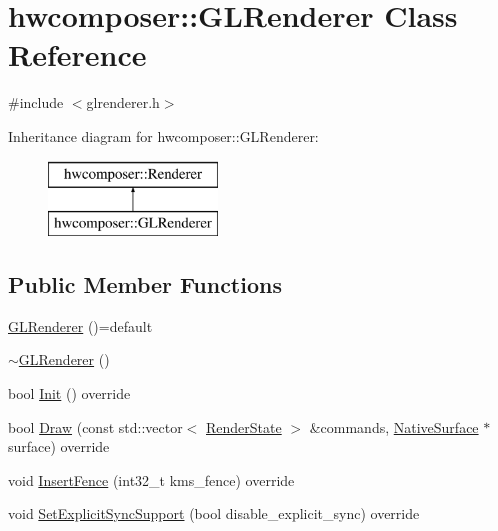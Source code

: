 \hypertarget{classhwcomposer_1_1GLRenderer}{}\section{hwcomposer\+:\+:G\+L\+Renderer Class Reference}
\label{classhwcomposer_1_1GLRenderer}


{\ttfamily \#include $<$glrenderer.\+h$>$}

Inheritance diagram for hwcomposer\+:\+:G\+L\+Renderer\+:\begin{figure}[H]
\begin{center}
\leavevmode
\includegraphics[height=2.000000cm]{classhwcomposer_1_1GLRenderer}
\end{center}
\end{figure}
\subsection*{Public Member Functions}
\begin{DoxyCompactItemize}
\item 
\mbox{\hyperlink{classhwcomposer_1_1GLRenderer_ad7df946c8af9df0bf948c04ecbf043d2}{G\+L\+Renderer}} ()=default
\item 
\mbox{\hyperlink{classhwcomposer_1_1GLRenderer_a8d398306fa084b620d309e9713b197d1}{$\sim$\+G\+L\+Renderer}} ()
\item 
bool \mbox{\hyperlink{classhwcomposer_1_1GLRenderer_a13460f969b8fd85b74ae1fecadff744e}{Init}} () override
\item 
bool \mbox{\hyperlink{classhwcomposer_1_1GLRenderer_a961208b3640ffb78a15438ca4504fe1a}{Draw}} (const std\+::vector$<$ \mbox{\hyperlink{structhwcomposer_1_1RenderState}{Render\+State}} $>$ \&commands, \mbox{\hyperlink{classhwcomposer_1_1NativeSurface}{Native\+Surface}} $\ast$surface) override
\item 
void \mbox{\hyperlink{classhwcomposer_1_1GLRenderer_af9eecc3a31c3acadaae84d2b31cf4807}{Insert\+Fence}} (int32\+\_\+t kms\+\_\+fence) override
\item 
void \mbox{\hyperlink{classhwcomposer_1_1GLRenderer_a8bd09dabfc0bd223f783454609b48a82}{Set\+Explicit\+Sync\+Support}} (bool disable\+\_\+explicit\+\_\+sync) override
\end{DoxyCompactItemize}


